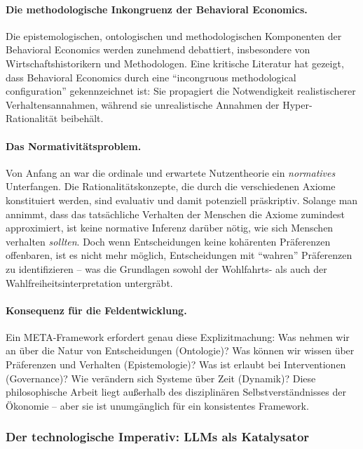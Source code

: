 \paragraph{Die methodologische Inkongruenz der Behavioral Economics.}
Die epistemologischen, ontologischen und methodologischen Komponenten der Behavioral Economics werden zunehmend debattiert, insbesondere von Wirtschaftshistorikern und Methodologen. Eine kritische Literatur hat gezeigt, dass Behavioral Economics durch eine ``incongruous methodological configuration'' gekennzeichnet ist: Sie propagiert die Notwendigkeit realistischerer Verhaltensannahmen, während sie unrealistische Annahmen der Hyper-Rationalität beibehält.

\paragraph{Das Normativitätsproblem.}
Von Anfang an war die ordinale und erwartete Nutzentheorie ein \textit{normatives} Unterfangen. Die Rationalitätskonzepte, die durch die verschiedenen Axiome konstituiert werden, sind evaluativ und damit potenziell präskriptiv. Solange man annimmt, dass das tatsächliche Verhalten der Menschen die Axiome zumindest approximiert, ist keine normative Inferenz darüber nötig, wie sich Menschen verhalten \textit{sollten}. Doch wenn Entscheidungen keine kohärenten Präferenzen offenbaren, ist es nicht mehr möglich, Entscheidungen mit ``wahren'' Präferenzen zu identifizieren -- was die Grundlagen sowohl der Wohlfahrts- als auch der Wahlfreiheitsinterpretation untergräbt.

\paragraph{Konsequenz für die Feldentwicklung.}
Ein META-Framework erfordert genau diese Explizitmachung: Was nehmen wir an über die Natur von Entscheidungen (Ontologie)? Was können wir wissen über Präferenzen und Verhalten (Epistemologie)? Was ist erlaubt bei Interventionen (Governance)? Wie verändern sich Systeme über Zeit (Dynamik)? Diese philosophische Arbeit liegt außerhalb des disziplinären Selbstverständnisses der Ökonomie -- aber sie ist unumgänglich für ein konsistentes Framework.

\subsubsection{Der technologische Imperativ: LLMs als Katalysator}

